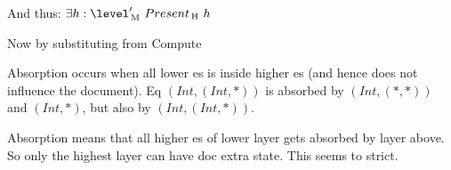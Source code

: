 And thus: $\exists h : \level'\M~Present\H~h$


Now by substituting from {\sc Compute}






Absorption occurs when all lower es is inside higher es (and hence does not influence the document). Eq $(Int,(Int,*))$ is absorbed by  $(Int,(*,*))$ and $(Int,*)$, but also by $(Int,(Int,*))$.

Absorption means that all higher es of lower layer gets absorbed by layer above. So only the highest layer can have doc extra state. This seems to strict.

